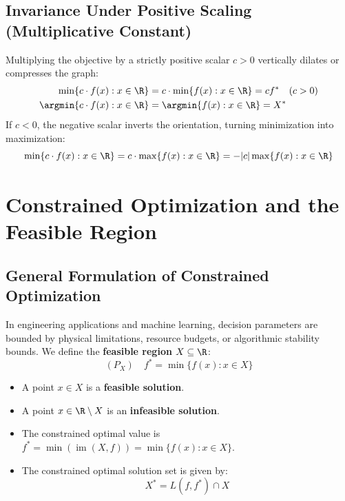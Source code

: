 \subsection{Invariance Under Positive Scaling (Multiplicative Constant)}
Multiplying the objective by a strictly positive scalar $c > 0$ vertically dilates or compresses the graph:
\begin{align}
\min \{ c \cdot f(x) : x \in \R \} &= c \cdot \min \{ f(x) : x \in \R \} = c f^* \quad (c > 0) \\
\argmin \{ c \cdot f(x) : x \in \R \} &= \argmin \{ f(x) : x \in \R \} = X^*
\end{align}
If $c < 0$, the negative scalar inverts the orientation, turning minimization into maximization:
\begin{equation}
\min \{ c \cdot f(x) : x \in \R \} = c \cdot \max \{ f(x) : x \in \R \} = - |c| \max \{ f(x) : x \in \R \}
\end{equation}


\FloatBarrier
\section{Constrained Optimization and the Feasible Region}
\label{sec:opt-constrained-feasible-region}

\subsection{General Formulation of Constrained Optimization}
In engineering applications and machine learning, decision parameters are bounded by physical limitations, resource budgets, or algorithmic stability bounds. We define the \textbf{feasible region} $X \subseteq \R$:
\begin{equation}
(P_X) \quad f^* = \min \{ f(x) : x \in X \}
\end{equation}
\begin{itemize}
    \item A point $x \in X$ is a \textbf{feasible solution}.
    \item A point $x \in \R \setminus X$ is an \textbf{infeasible solution}.
    \item The constrained optimal value is $f^* = \min(\operatorname{im}(X, f)) = \min \{ f(x) : x \in X \}$.
    \item The constrained optimal solution set is given by:
    \begin{equation}
    X^* = L(f, f^*) \cap X
    \end{equation}
\end{itemize}

